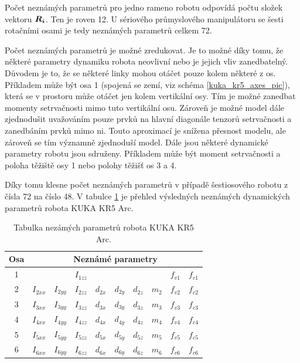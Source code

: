 Počet neznámých parametrů pro jedno rameno robotu odpovídá počtu složek vektoru $\boldsymbol{R_i}$. Ten je roven 12. U sériového průmyslového manipulátoru se šesti rotačními osami je tedy neznámých parametrů celkem 72. 

Počet neznámých parametrů je možné zredukovat. Je to možné díky tomu, že některé parametry dynamiku robota neovlivní nebo je jejich vliv zanedbatelný. Důvodem je to, že se některé linky mohou otáčet pouze kolem některé z os. Příkladem může být osa 1 (spojená se zemí, viz schéma \ref{kuka_kr5_axes_pic}), která se v prostoru může otáčet jen kolem vertikální osy. Tím je možné zanedbat momenty setrvačnosti mimo tuto vertikální osu. Zároveň je možné model dále zjednodušit uvažováním pouze prvků na hlavní diagonále tenzorů setrvačnosti a zanedbáním prvků mimo ni. Touto aproximací je snížena přesnost modelu, ale zároveň se tím významně zjednoduší model. Dále jsou některé dynamické parametry robotu jsou sdruženy. Příkladem může být moment setrvačnosti a poloha těžiště osy 1 nebo polohy těžišť os 3 a 4.

Díky tomu klesne počet neznámých parametrů v případě šestiosového robotu z čísla 72 na číslo 48. V tabulce \ref{tab_hled_param} je přehled výsledných neznámých dynamických parametrů robota KUKA KR5 Arc.
\\

\begin{table}[ht]
  \centering
  \caption{Tabulka nezámých parametrů robota KUKA KR5 Arc.}
    \begin{tabular}{c|lllllllll}
    \multicolumn{1}{c|}{Osa} & \multicolumn{9}{c}{Neznámé parametry}  \\
    \hline
    1 &       	  &	          & $I_{1zz}$ &          &          &          & & $f_{v1}$ & $f_{c1}$ \\
    2 & $I_{2xx}$ & $I_{2yy}$ & $I_{2zz}$ & $d_{2x}$ & $d_{2y}$ & $d_{2z}$ & $m_{2}$ & $f_{v2}$ & $f_{c2}$ \\
    3 & $I_{3xx}$ & $I_{3yy}$ & $I_{3zz}$ & $d_{3x}$ & $d_{3y}$ & $d_{3z}$ & $m_{3}$ & $f_{v3}$ & $f_{c3}$ \\
    4 & $I_{4xx}$ & $I_{4yy}$ & $I_{4zz}$ & $d_{4x}$ & $d_{4y}$ & $d_{4z}$ & $m_{4}$ & $f_{v4}$ & $f_{c4}$ \\
    5 & $I_{5xx}$ & $I_{5yy}$ & $I_{5zz}$ & $d_{5x}$ & $d_{5y}$ & $d_{5z}$ & $m_{5}$ & $f_{v5}$ & $f_{c5}$ \\
    6 & $I_{6xx}$ & $I_{6yy}$ & $I_{6zz}$ & $d_{6x}$ & $d_{6y}$ & $d_{6z}$ & $m_{6}$ & $f_{v6}$ & $f_{c6}$ \\
    \end{tabular}%
  \label{tab_hled_param}%
\end{table}%

